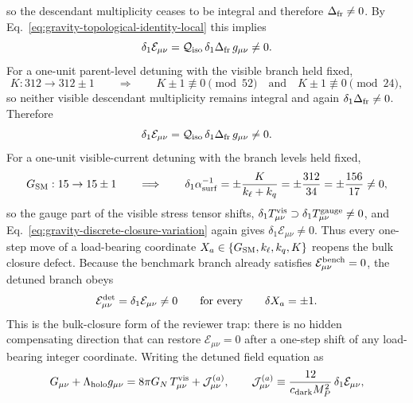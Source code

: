 \documentclass[11pt]{article}
\begin{document}
so the descendant multiplicity ceases to be integral and therefore
$\Delta_{\rm fr}\neq0$. By Eq.~\eqref{eq:gravity-topological-identity-local}
this implies
\begin{equation}
\label{eq:gravity-kq-detuning-nonzero-closure}
 \delta_1\mathcal E_{\mu\nu}
 =
 \mathcal Q_{\rm iso}\,\delta_1\Delta_{\rm fr}\,g_{\mu\nu}
 \neq0.
\end{equation}
For a one-unit parent-level detuning with the visible branch held fixed,
\begin{equation}
\label{eq:gravity-parent-unit-detuning}
 K:312\to312\pm1
 \qquad\Longrightarrow\qquad
 K\pm1\not\equiv0\pmod{52}
 \quad\text{and}\quad
 K\pm1\not\equiv0\pmod{24},
\end{equation}
so neither visible descendant multiplicity remains integral and again
$\delta_1\Delta_{\rm fr}\neq0$. Therefore
\begin{equation}
\label{eq:gravity-parent-detuning-nonzero-closure}
 \delta_1\mathcal E_{\mu\nu}
 =
 \mathcal Q_{\rm iso}\,\delta_1\Delta_{\rm fr}\,g_{\mu\nu}
 \neq0.
\end{equation}
For a one-unit visible-current detuning with the branch levels held fixed,
\begin{equation}
\label{eq:gravity-gsm-unit-detuning}
 G_{\rm SM}:15\to15\pm1
 \qquad\Longrightarrow\qquad
 \delta_1\alpha^{-1}_{\rm surf}
 =
 \pm\frac{K}{k_{\ell}+k_q}
 =
 \pm\frac{312}{34}
 =
 \pm\frac{156}{17}
 \neq0,
\end{equation}
so the gauge part of the visible stress tensor shifts,
$\delta_1T^{\rm vis}_{\mu\nu}\supset\delta_1T^{\rm gauge}_{\mu\nu}\neq0$,
and Eq.~\eqref{eq:gravity-discrete-closure-variation} again gives
$\delta_1\mathcal E_{\mu\nu}\neq0$. Thus every one-step move of a
load-bearing coordinate $X_a\in\{G_{\rm SM},k_{\ell},k_q,K\}$ reopens the bulk
closure defect. Because the benchmark branch already satisfies
$\mathcal E_{\mu\nu}^{\rm bench}=0$, the detuned branch obeys
\begin{equation}
\label{eq:gravity-discrete-detuned-closure}
 \mathcal E_{\mu\nu}^{\rm det}
 =
 \delta_1\mathcal E_{\mu\nu}
 \neq 0
 \qquad\text{for every}\qquad
 \delta X_a=\pm1.
\end{equation}
This is the bulk-closure form of the reviewer trap: there is no hidden
compensating direction that can restore $\mathcal E_{\mu\nu}=0$ after a
one-step shift of any load-bearing integer coordinate. Writing the detuned
field equation as
\begin{equation}
\label{eq:gravity-detuned-einstein-identity}
 G_{\mu\nu}+\Lambda_{\rm holo}g_{\mu\nu}
 =
 8\pi G_N\,T^{\rm vis}_{\mu\nu}
 +\mathcal J_{\mu\nu}^{(a)},
 \qquad
 \mathcal J_{\mu\nu}^{(a)}
 \equiv
 \frac{12}{c_{\rm dark}M_P^2}\,\delta_1\mathcal E_{\mu\nu},
\end{equation}
\end{document}
